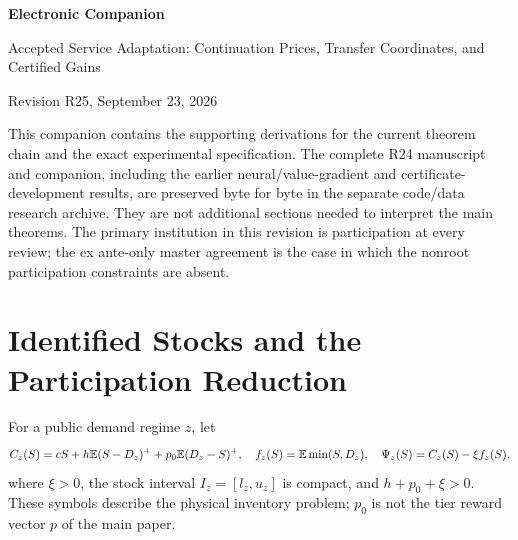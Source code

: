 \documentclass[11pt,letterpaper]{article}
\theoremstyle{definition}\newtheorem{remark}[theorem]{Remark}
\begin{document}
\begin{center}{\Large\bfseries Electronic Companion}\par\vspace{.12in}
Accepted Service Adaptation: Continuation Prices, Transfer Coordinates, and Certified Gains\par
Revision R25, September 23, 2026\end{center}
This companion contains the supporting derivations for the current theorem chain and the exact experimental specification. The complete R24 manuscript and companion, including the earlier neural/value-gradient and certificate-development results, are preserved byte for byte in the separate code/data research archive. They are not additional sections needed to interpret the main theorems. The primary institution in this revision is participation at every review; the ex ante-only master agreement is the case in which the nonroot participation constraints are absent.

\section{Identified Stocks and the Participation Reduction}\label{ec:stock}
For a public demand regime $z$, let
\[
 C_z(S)=cS+h\mathbb E(S-D_z)^++p_0\mathbb E(D_z-S)^+,\quad
 f_z(S)=\mathbb E\min(S,D_z),\quad \Psi_z(S)=C_z(S)-\xi f_z(S),
\]
where $\xi>0$, the stock interval $I_z=[l_z,u_z]$ is compact, and $h+p_0+\xi>0$. These symbols describe the physical inventory problem; $p_0$ is not the tier reward vector $p$ of the main paper.
\end{document}

